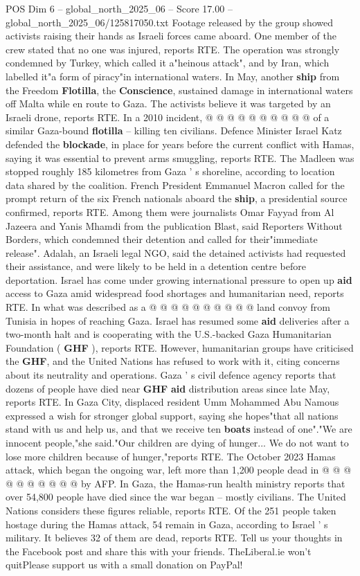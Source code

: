 \begin{textsample}{POS Dim 6 – global\_north\_2025\_06 – Score 17.00 – global\_north\_2025\_06/125817050.txt}
Footage released by the group showed activists raising their hands as Israeli forces came aboard.
One member of the crew stated that no one was injured, reports RTE.
The operation was strongly condemned by Turkey, which called it a"heinous attack", and by Iran, which labelled it"a form of piracy"in international waters.
In May, another \textbf{ship} from the Freedom \textbf{Flotilla}, the \textbf{Conscience}, sustained damage in international waters off Malta while en route to Gaza.
The activists believe it was targeted by an Israeli drone, reports RTE.
In a 2010 incident, @ @ @ @ @ @ @ @ @ @ of a similar Gaza-bound \textbf{flotilla} -- killing ten civilians.
Defence Minister Israel Katz defended the \textbf{blockade}, in place for years before the current conflict with Hamas, saying it was essential to prevent arms smuggling, reports RTE.
The Madleen was stopped roughly 185 kilometres from Gaza ' s shoreline, according to location data shared by the coalition.
French President Emmanuel Macron called for the prompt return of the six French nationals aboard the \textbf{ship}, a presidential source confirmed, reports RTE.
Among them were journalists Omar Fayyad from Al Jazeera and Yanis Mhamdi from the publication Blast, said Reporters Without Borders, which condemned their detention and called for their"immediate release".
Adalah, an Israeli legal NGO, said the detained activists had requested their assistance, and were likely to be held in a detention centre before deportation.
Israel has come under growing international pressure to open up \textbf{aid} access to Gaza amid widespread food shortages and humanitarian need, reports RTE.
In what was described as a @ @ @ @ @ @ @ @ @ @ land convoy from Tunisia in hopes of reaching Gaza.
Israel has resumed some \textbf{aid} deliveries after a two-month halt and is cooperating with the U.S.-backed Gaza Humanitarian Foundation ( \textbf{GHF} ), reports RTE.
However, humanitarian groups have criticised the \textbf{GHF}, and the United Nations has refused to work with it, citing concerns about its neutrality and operations.
Gaza ' s civil defence agency reports that dozens of people have died near \textbf{GHF} \textbf{aid} distribution areas since late May, reports RTE.
In Gaza City, displaced resident Umm Mohammed Abu Namous expressed a wish for stronger global support, saying she hopes"that all nations stand with us and help us, and that we receive ten \textbf{boats} instead of one"."We are innocent people,"she said."Our children are dying of hunger...
We do not want to lose more children because of hunger,"reports RTE.
The October 2023 Hamas attack, which began the ongoing war, left more than 1,200 people dead in @ @ @ @ @ @ @ @ @ @ by AFP.
In Gaza, the Hamas-run health ministry reports that over 54,800 people have died since the war began -- mostly civilians.
The United Nations considers these figures reliable, reports RTE.
Of the 251 people taken hostage during the Hamas attack, 54 remain in Gaza, according to Israel ' s military.
It believes 32 of them are dead, reports RTE.
Tell us your thoughts in the Facebook post and share this with your friends.
TheLiberal.ie won't quitPlease support us with a small donation on PayPal!


\end{textsample}
